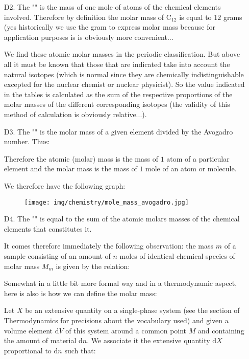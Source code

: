 \begin{enumerate}
		\item[D2.] The "" is the mass of one mole of atoms of the chemical elements involved. Therefore by definition the molar mass of $\mathrm{C}_{12}$ is equal to $12$ grams (yes historically we use the gram to express molar mass because for application purposes is is obviously more convenient...
		
		\begin{tcolorbox}[title=Remark,colframe=black,arc=10pt]
		We find these atomic molar masses in the periodic classification. But above all it must be known that those that are indicated take into account the natural isotopes (which is normal since they are chemically indistinguishable excepted for the nuclear chemist or nuclear physicist). So the value indicated in the tables is calculated as the sum of the respective proportions of the molar masses of the different corresponding isotopes (the validity of this method of calculation is obviously relative...).
		\end{tcolorbox}	
		
		\item[D3.] The "" is the molar mass of a given element divided by the Avogadro number. Thus:
		
		Therefore the atomic (molar) mass is the mass of $1$ atom of a particular element and the molar mass is the mass of $1$ mole of an atom or molecule.
		
		We therefore have the following graph:
		\begin{figure}[H]
			\begin{center}
				\texttt{[image: img/chemistry/mole\_mass\_avogadro.jpg]}
			\end{center}	
		\end{figure}
		
		\item[D4.] The "" is equal to the sum of the atomic molars  masses of the chemical elements that constitutes it.
		
		It comes therefore immediately the following observation: the mass $m$ of a sample consisting of an amount of $n$ moles of identical chemical species of molar mass $M_m$ is given by the relation:
		
		Somewhat in a little bit more formal way and in a thermodynamic aspect, here is also is how we can define the molar mass:
		
		Let $X$ be an extensive quantity on a single-phase system (see the section of Thermodynamics for precisions about the vocabulary used) and given a volume element $\mathrm{d}V$ of this system around a common point $M$ and containing the amount of material $\mathrm{d}n$. We associate it the extensive quantity $\mathrm{d}X$ proportional to $\mathrm{d}n$ such that:
		

\end{enumerate}
